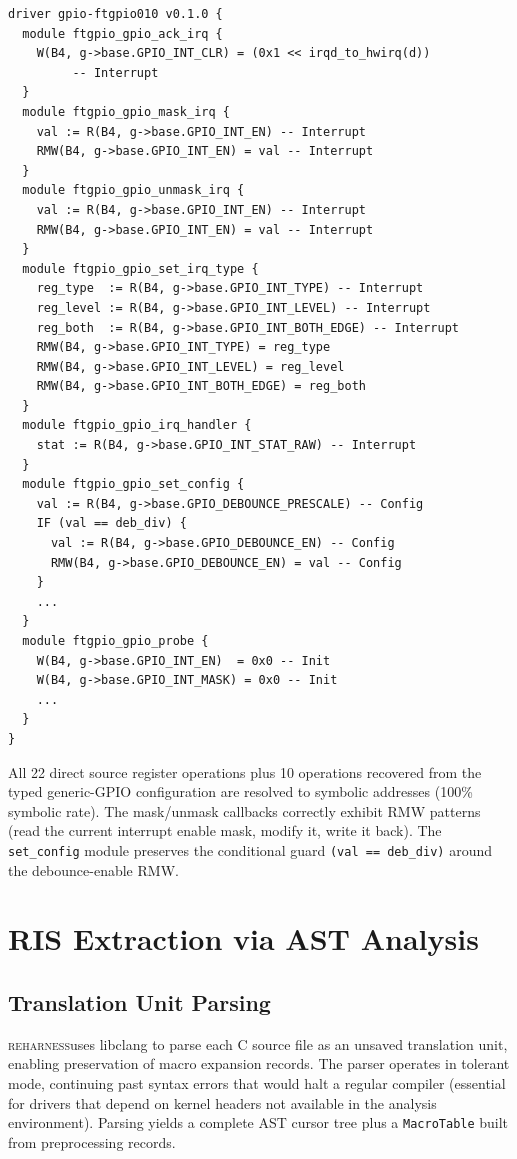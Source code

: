 \documentclass[sigconf,review]{acmart}
\newcommand{\reharness}{\textsc{reharness}}
\newcommand{\rislang}{RIS}
\begin{document}
\begin{lstlisting}[language=ris,label={lst:ris_example},caption={Excerpt from the extracted \rislang specification for gpio-ftgpio010 (14 modules, 32 ops including generic-library summaries)}]
driver gpio-ftgpio010 v0.1.0 {
  module ftgpio_gpio_ack_irq {
    W(B4, g->base.GPIO_INT_CLR) = (0x1 << irqd_to_hwirq(d))
         -- Interrupt
  }
  module ftgpio_gpio_mask_irq {
    val := R(B4, g->base.GPIO_INT_EN) -- Interrupt
    RMW(B4, g->base.GPIO_INT_EN) = val -- Interrupt
  }
  module ftgpio_gpio_unmask_irq {
    val := R(B4, g->base.GPIO_INT_EN) -- Interrupt
    RMW(B4, g->base.GPIO_INT_EN) = val -- Interrupt
  }
  module ftgpio_gpio_set_irq_type {
    reg_type  := R(B4, g->base.GPIO_INT_TYPE) -- Interrupt
    reg_level := R(B4, g->base.GPIO_INT_LEVEL) -- Interrupt
    reg_both  := R(B4, g->base.GPIO_INT_BOTH_EDGE) -- Interrupt
    RMW(B4, g->base.GPIO_INT_TYPE) = reg_type
    RMW(B4, g->base.GPIO_INT_LEVEL) = reg_level
    RMW(B4, g->base.GPIO_INT_BOTH_EDGE) = reg_both
  }
  module ftgpio_gpio_irq_handler {
    stat := R(B4, g->base.GPIO_INT_STAT_RAW) -- Interrupt
  }
  module ftgpio_gpio_set_config {
    val := R(B4, g->base.GPIO_DEBOUNCE_PRESCALE) -- Config
    IF (val == deb_div) {
      val := R(B4, g->base.GPIO_DEBOUNCE_EN) -- Config
      RMW(B4, g->base.GPIO_DEBOUNCE_EN) = val -- Config
    }
    ...
  }
  module ftgpio_gpio_probe {
    W(B4, g->base.GPIO_INT_EN)  = 0x0 -- Init
    W(B4, g->base.GPIO_INT_MASK) = 0x0 -- Init
    ...
  }
}
\end{lstlisting}

All 22 direct source register operations plus 10 operations recovered from the typed generic-GPIO configuration are resolved to symbolic addresses (100\% symbolic rate). The mask/unmask callbacks correctly exhibit RMW patterns (read the current interrupt enable mask, modify it, write it back). The \texttt{set\_config} module preserves the conditional guard \texttt{(val == deb\_div)} around the debounce-enable RMW.

\section{RIS Extraction via AST Analysis}

\subsection{Translation Unit Parsing}

\reharness uses libclang to parse each C source file as an unsaved translation unit, enabling preservation of macro expansion records. The parser operates in tolerant mode, continuing past syntax errors that would halt a regular compiler (essential for drivers that depend on kernel headers not available in the analysis environment). Parsing yields a complete AST cursor tree plus a \texttt{MacroTable} built from preprocessing records.
\end{document}
